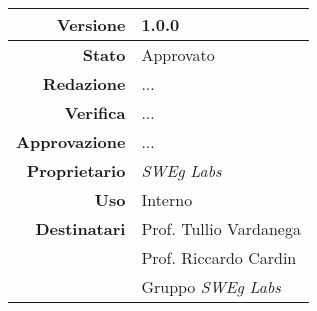 \begin{center}
\begin{tabular}{r|l}
    \textbf{Versione} & 1.0.0 \\
    \hline
    \textbf{Stato} & Approvato \\
    \hline
    \textbf{Redazione} & ... \\
    \hline
    \textbf{Verifica} & ... \\
    \hline
    \textbf{Approvazione} & ... \\
    \hline
    \textbf{Proprietario} & \emph{SWEg Labs} \\
    \hline
    \textbf{Uso} & Interno \\
    \hline
    \textbf{Destinatari} & Prof. Tullio Vardanega \\
                            & Prof. Riccardo Cardin \\
                            & Gruppo \emph{SWEg Labs} \\
\end{tabular}
\end{center}
    
